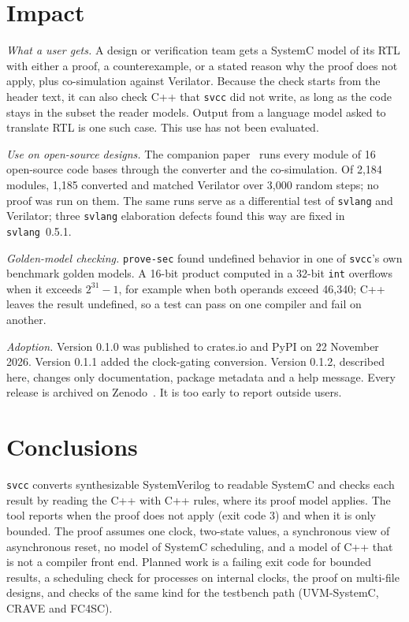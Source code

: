 \documentclass[preprint,12pt]{elsarticle}
\newcommand{\code}[1]{\texttt{#1}}
\begin{document}
\section{Impact}
\label{sec:impact}

\emph{What a user gets.} A design or verification team gets a SystemC model
of its RTL with either a proof, a counterexample, or a stated reason why the proof does not apply,
plus co-simulation against Verilator. Because the check starts from the header text, it can also
check C++ that \code{svcc} did not write, as long as the code stays in the subset the reader
models. Output from a language model asked to translate RTL is one such case. This use has not
been evaluated.

\emph{Use on open-source designs.} The companion paper~\cite{kubavat2026rtltv} runs every module of
16 open-source code bases through the converter and the co-simulation. Of 2,184 modules, 1,185
converted and matched Verilator over 3,000 random steps; no proof was run on them. The same runs serve as a
differential test of \code{svlang} and Verilator; three \code{svlang} elaboration defects found
this way are fixed in \code{svlang}~0.5.1.

\emph{Golden-model checking.} \code{prove-sec} found undefined behavior in one of \code{svcc}'s own
benchmark golden models. A 16-bit product computed in a 32-bit \code{int} overflows when it
exceeds $2^{31}-1$, for example when both operands exceed 46,340; C++ leaves the result undefined, so a test can pass on one compiler and fail on
another.

\emph{Adoption.} Version 0.1.0 was published to crates.io and PyPI on 22 November 2026. Version
0.1.1 added the clock-gating conversion. Version 0.1.2, described here, changes only documentation,
package metadata and a help message. Every release is archived on Zenodo~\cite{kubavat2026svcczenodo}.
It is too early to report outside users.

\section{Conclusions}
\label{sec:conclusions}

\code{svcc} converts synthesizable SystemVerilog to readable SystemC and checks each result by
reading the C++ with C++ rules, where its proof model applies. The tool reports when the proof does
not apply (exit code 3) and when it is only bounded. The proof assumes one clock, two-state values, a synchronous view of asynchronous reset, no
model of SystemC scheduling, and a model of C++ that is not a compiler front end. Planned work is a
failing exit code for bounded results, a scheduling check for processes on internal clocks, the
proof on multi-file designs, and checks of the same kind for the testbench path (UVM-SystemC,
CRAVE and FC4SC).
\end{document}
